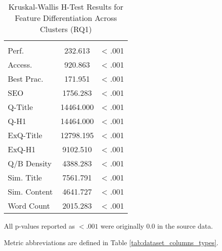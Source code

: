 \begin{table}[htbp!]
\centering
\caption{Kruskal-Wallis H-Test Results for Feature Differentiation Across Clusters (RQ1)}
\label{app:rq1_cluster_validation_table}
\small
\setlength{\tabcolsep}{3pt}
\renewcommand{\arraystretch}{1}
\begin{threeparttable}
\begin{tabular*}{\textwidth}{l@{\extracolsep{\fill}} S[table-format=5.3] S[table-format=1.3,table-comparator=true]}
\toprule
{} & {} & {} \\
\dmidrule
Perf.  & 232.613 & < .001 \\
Access.  & 920.863 & < .001 \\
Best Prac.  & 171.951 & < .001 \\
SEO  & 1756.283 & < .001 \\
Q-Title  & 14464.000 & < .001 \\
Q-H1  & 14464.000 & < .001 \\
ExQ-Title  & 12798.195 & < .001 \\
ExQ-H1  & 9102.510 & < .001 \\
Q/B Density  & 4388.283 & < .001 \\
Sim. Title  & 7561.791 & < .001 \\
Sim. Content  & 4641.727 & < .001 \\
Word Count  & 2015.283 & < .001 \\
\bottomrule
\end{tabular*}
\begin{tablenotes}[flushleft]
\scriptsize
\item All p-values reported as $< .001$ were originally $0.0$ in the source data.
\item Metric abbreviations are defined in Table \ref{tab:dataset_columns_types}.
\end{tablenotes}
\end{threeparttable}
\end{table}
